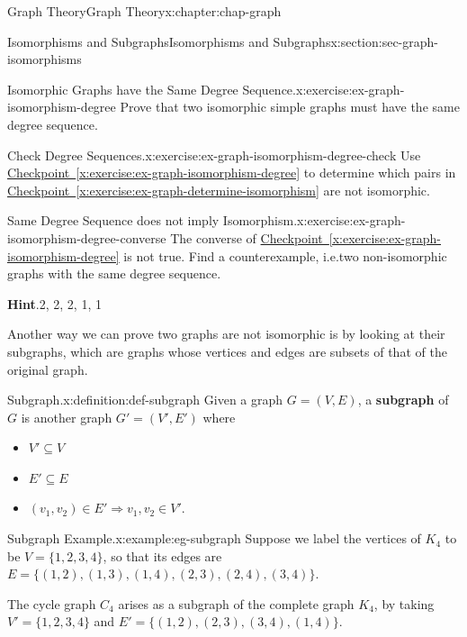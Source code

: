 \documentclass[oneside,10pt,]{book}
\newcommand{\blocktitlefont}{\relax}
\newcommand{\xreffont}{\relax}
\newcommand{\terminology}[1]{\textbf{#1}}
\numberwithin{equation}{section}
\begin{document}
\begin{chapterptx}{Graph Theory}{}{Graph Theory}{}{}{x:chapter:chap-graph}
\begin{sectionptx}{Isomorphisms and Subgraphs}{}{Isomorphisms and Subgraphs}{}{}{x:section:sec-graph-isomorphisms}
\begin{inlineexercise}{Isomorphic Graphs have the Same Degree Sequence.}{x:exercise:ex-graph-isomorphism-degree}
Prove that two isomorphic simple graphs must have the same degree sequence.%
\end{inlineexercise}
\begin{inlineexercise}{Check Degree Sequences.}{x:exercise:ex-graph-isomorphism-degree-check}%
Use \hyperref[x:exercise:ex-graph-isomorphism-degree]{Checkpoint~{\xreffont\ref{x:exercise:ex-graph-isomorphism-degree}}} to determine which pairs in \hyperref[x:exercise:ex-graph-determine-isomorphism]{Checkpoint~{\xreffont\ref{x:exercise:ex-graph-determine-isomorphism}}} are not isomorphic.%
\end{inlineexercise}
\begin{inlineexercise}{Same Degree Sequence does not imply Isomorphism.}{x:exercise:ex-graph-isomorphism-degree-converse}%
The converse of \hyperref[x:exercise:ex-graph-isomorphism-degree]{Checkpoint~{\xreffont\ref{x:exercise:ex-graph-isomorphism-degree}}} is not true. Find a counterexample, i.e.\@ two non-isomorphic graphs with the same degree sequence.%
\par\smallskip%
\noindent\textbf{\blocktitlefont Hint}.\hypertarget{g:hint:id490345}{}\quad{}2, 2, 2, 1, 1%
\end{inlineexercise}
Another way we can prove two graphs are not isomorphic is by looking at their subgraphs, which are graphs whose vertices and edges are subsets of that of the original graph.%
\begin{definition}{Subgraph.}{x:definition:def-subgraph}%
Given a graph \(G = (V,E)\), a \terminology{subgraph} of \(G\) is another graph \(G' = (V', E')\) where%
\begin{itemize}[label=\textbullet]
\item{}\(\displaystyle V' \subseteq V\)%
\item{}\(\displaystyle E' \subseteq E\)%
\item{}\((v_1,v_2) \in E' \Rightarrow v_1,v_2 \in V'\).%
\end{itemize}
%
\end{definition}
\begin{example}{Subgraph Example.}{x:example:eg-subgraph}%
Suppose we label the vertices of \(K_4\) to be \(V = \{1,2,3,4\}\), so that its edges are \(E = \{(1,2),(1,3),(1,4),(2,3),(2,4),(3,4)\}\).%
\par
The cycle graph \(C_4\) arises as a subgraph of the complete graph \(K_4\), by taking \(V' = \{1,2,3,4\}\) and \(E' = \{(1,2),(2,3),(3,4),(1,4)\}\).%
\begin{sidebyside}{1}{0.375}{0.375}{0}%
\begin{sbspanel}{0.25}%

\end{sbspanel}
\end{sidebyside}
\end{example}
\end{sectionptx}
\end{chapterptx}
\end{document}
